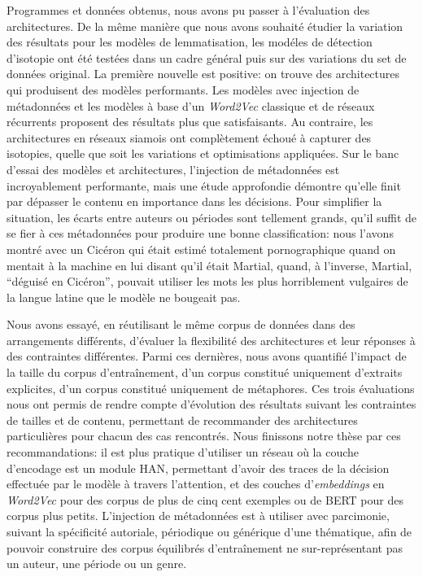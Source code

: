 Programmes et données obtenus, nous avons pu passer à l'évaluation des architectures. De la même manière que nous avons souhaité étudier la variation des résultats pour les modèles de lemmatisation, les modéles de détection d'isotopie ont été testées dans un cadre général puis sur des variations du set de données original. La première nouvelle est positive: on trouve des architectures qui produisent des modèles performants. Les modèles avec injection de métadonnées et les modèles à base d'un \textit{Word2Vec} classique et de réseaux récurrents proposent des résultats plus que satisfaisants. Au contraire, les architectures en réseaux siamois ont complètement échoué à capturer des isotopies, quelle que soit les variations et optimisations appliquées. Sur le banc d'essai des modèles et architectures, l'injection de métadonnées est incroyablement performante, mais une étude approfondie démontre qu'elle finit par dépasser le contenu en importance dans les décisions. Pour simplifier la situation, les écarts entre auteurs ou périodes sont tellement grands, qu'il suffit de se fier à ces métadonnées pour produire une bonne classification: nous l'avons montré avec un Cicéron qui était estimé totalement pornographique quand on mentait à la machine en lui disant qu'il était Martial, quand, à l'inverse, Martial, \enquote{déguisé en Cicéron}, pouvait utiliser les mots les plus horriblement vulgaires de la langue latine que le modèle ne bougeait pas.

Nous avons essayé, en réutilisant le même corpus de données dans des arrangements différents, d'évaluer la flexibilité des architectures et leur réponses à des contraintes différentes. Parmi ces dernières, nous avons quantifié l'impact de la taille du corpus d'entraînement, d'un corpus constitué uniquement d'extraits explicites, d'un corpus constitué uniquement de métaphores. Ces trois évaluations nous ont permis de rendre compte d'évolution des résultats suivant les contraintes de tailles et de contenu, permettant de recommander des architectures particulières pour chacun des cas rencontrés. Nous finissons notre thèse par ces recommandations: il est plus pratique d'utiliser un réseau où la couche d'encodage est un module HAN, permettant d'avoir des traces de la décision effectuée par le modèle à travers l'attention, et des couches d'\textit{embeddings} en \textit{Word2Vec} pour des corpus de plus de cinq cent exemples ou de BERT pour des corpus plus petits. L'injection de métadonnées est à utiliser avec parcimonie, suivant la spécificité autoriale, périodique ou générique d'une thématique, afin de pouvoir construire des corpus équilibrés d'entraînement ne sur-représentant pas un auteur, une période ou un genre.

